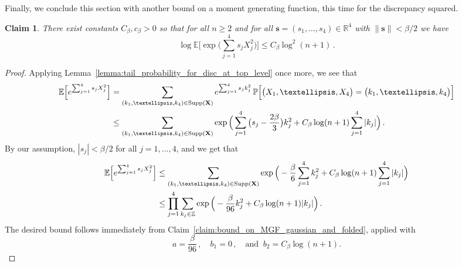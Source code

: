 \documentclass[11pt]{amsart}
\newtheorem{claim}[theorem]{Claim}
\theoremstyle{definition}
\theoremstyle{remark}
\numberwithin{equation}{section}
\newcommand{\bR}{\mathbb R}
\newcommand{\bZ}{\mathbb Z}
\newcommand{\bP}{\mathbb P}
\newcommand{\bE}{\mathbb E}
\begin{document}
	Finally, we conclude this section with another bound on a moment generating function, this time for the discrepancy squared.
	\begin{claim}
		\label{claim:upper_bound_on_moment_generating_function_disc_squared_top_level}
		There exist constants $C_\beta,c_\beta>0$ so that for all $n\ge 2$ and for all $\boldsymbol{s}=(s_1,\ldots,s_4) \in \bR^4$ with $\|\boldsymbol{s}\|< \beta/2$ we have
		\[
		\log \bE \bigg[\exp \Big(\sum_{j=1}^{4} s_j X_j^2\Big)\bigg] \le C_\beta \log^2(n+1) \, .
		\]
	\end{claim}
	\begin{proof}
		Applying Lemma~\ref{lemma:tail_probability_for_disc_at_top_level} once more, we see that
		\begin{align*}
			\bE\Big[ e^{\sum_{j=1}^{4} s_j X_j^2} \Big]  & = \sum_{(k_1,\ldots,k_4)\in \text{Supp}(\bf{X})} e^{\sum_{j=1}^{4} s_j k_j^2} \, \bP\Big[\big(X_1,\ldots,X_4\big) = \big(k_1,\ldots,k_4\big)\Big] \\
			& \le \sum_{(k_1,\ldots,k_4)\in \text{Supp}(\bf{X})} \exp \Big(\sum_{j=1}^{4} \big(s_j -\frac{2\beta}{3} \big)k_j^2  + C_\beta \log(n+1) \sum_{j=1}^4 |k_j|\Big)\, .
		\end{align*}
		By our assumption, $|s_j| < \beta/2$ for all $j=1,\ldots,4$, and we get that
		\begin{align*}
			\bE\Big[ e^{\sum_{j=1}^{4} s_j X_j^2} \Big] &\le \sum_{(k_1,\ldots,k_4)\in \text{Supp}(\bf{X})} \exp \Big(-\frac{\beta}{6}\sum_{j=1}^{4} k_j^2  + C_\beta \log(n+1) \sum_{j=1}^4 |k_j|\Big) \\ & \le \prod_{j=1}^{4} \sum_{k_j\in \bZ} \exp \Big(-\frac{\beta}{96} k_j^2  + C_\beta \log(n+1) |k_j|\Big)\, .
		\end{align*}
		The desired bound follows immediately from Claim~\ref{claim:bound_on_MGF_gaussian_and_folded}, applied with
		\[
		a=\frac{\beta}{96}\, , \quad b_1 = 0\, , \quad \text{and }\ b_2= C_\beta \log(n+1).
		\]
	\end{proof}
\end{document}
